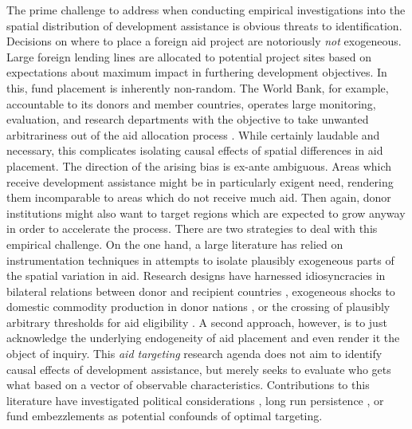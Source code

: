 \documentclass[11pt, oneside]{article}   	%
\begin{document}
The prime challenge to address when conducting empirical investigations into the spatial distribution of development assistance is obvious threats to identification. Decisions on where to place a foreign aid project are notoriously \emph{not} exogeneous. Large foreign lending lines are allocated to potential project sites based on expectations about maximum impact in furthering development objectives. In this, fund placement is inherently non-random. The World Bank, for example, accountable to its donors and member countries, operates large monitoring, evaluation, and research departments with the objective to take unwanted arbitrariness out of the aid allocation process \citep{Banerjee_EvaluationWorldBank_2006}. While certainly laudable and necessary, this complicates isolating causal effects of spatial differences in aid placement. The direction of the arising bias is ex-ante ambiguous. Areas which receive development assistance might be in particularly exigent need, rendering them incomparable to areas which do not receive much aid. Then again, donor institutions might also want to target regions which are expected to grow anyway in order to accelerate the process. There are two strategies to deal with this empirical challenge. On the one hand, a large literature has relied on instrumentation techniques in attempts to isolate plausibly exogeneous parts of the spatial variation in aid. Research designs have harnessed idiosyncracies in bilateral relations between donor and recipient countries \citep{Rajan_Aidgrowthwhat_2008}, exogeneous shocks to domestic commodity production in donor nations \citep{Nunn_USFoodAid_2014,Dreher_AidChinaGrowth_2017}, or the crossing of plausibly arbitrary thresholds for aid eligibility \citep{Galiani_effectaidgrowth_2017}. A second approach, however, is to just acknowledge the underlying endogeneity of aid placement and even render it the object of inquiry. This \emph{aid targeting} research agenda does not aim to identify causal effects of development assistance, but merely seeks to evaluate who gets what based on a vector of observable characteristics. Contributions to this literature have investigated political considerations \citep[e.g.][]{Dreher_Rogueaidempirical_2015}, long run persistence \citep{Alpino_LightingPathInfluence_2017}, or fund embezzlements \citep{Dreher_AiddemandAfrican_2016} as potential confounds of optimal targeting.
\end{document}
